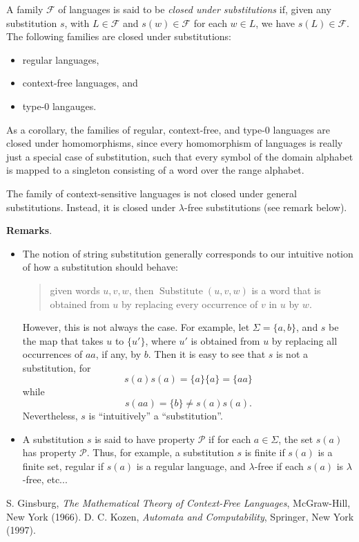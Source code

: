\documentclass[12pt]{article}
\begin{document}
A family $\mathscr{F}$ of languages is said to be \emph{closed under substitutions} if, given any substitution $s$, with $L \in \mathscr{F}$ and $s(w) \in \mathscr{F}$ for each $w\in L$, we have $s(L)\in \mathscr{F}$.  The following families  are closed under substitutions:
\begin{itemize}
\item regular languages, 
\item context-free languages, and 
\item type-0 langauges.
\end{itemize}
As a corollary, the families of regular, context-free, and type-0 languages are closed under homomorphisms, since every homomorphism of languages is really just a special case of substitution, such that every symbol of the domain alphabet is mapped to a singleton consisting of a word over the range alphabet.

The family of context-sensitive languages is not closed under general substitutions.  Instead, it is closed under  $\lambda$-free substitutions (see remark below).

\textbf{Remarks}.  
\begin{itemize}
\item
The notion of string substitution generally corresponds to our intuitive notion of how a substitution should behave: 
\begin{quote}
given words $u,v,w$, then $\operatorname{Substitute}(u,v,w)$ is a word that is obtained from $u$ by replacing every occurrence of $v$ in $u$ by $w$.  
\end{quote}
However, this is not always the case.  For example, let $\Sigma=\lbrace a,b\rbrace$, and $s$ be the map that takes $u$ to $\lbrace u'\rbrace$, where $u'$ is obtained from $u$ by replacing all occurrences of $aa$, if any, by $b$.  Then it is easy to see that $s$ is not a substitution, for
$$s(a)s(a)=\lbrace a\rbrace \lbrace a\rbrace = \lbrace aa\rbrace$$
while
$$s(aa)=\lbrace b\rbrace \ne s(a)s(a).$$
Nevertheless, $s$ is ``intuitively'' a ``substitution''.
\item
A substitution $s$ is said to have property $\mathcal{P}$ if for each $a\in \Sigma$, the set $s(a)$ has property $\mathcal{P}$.  Thus, for example, a substitution $s$ is finite if $s(a)$ is a finite set, regular if $s(a)$ is a regular language, and $\lambda$-free if each $s(a)$ is $\lambda$-free, etc...
\end{itemize}

\begin{thebibliography}{9}
 S. Ginsburg, {\em The Mathematical Theory of Context-Free Languages}, McGraw-Hill, New York (1966).
 D. C. Kozen, {\em Automata and Computability}, Springer, New York (1997).
\end{thebibliography}

\end{document}
